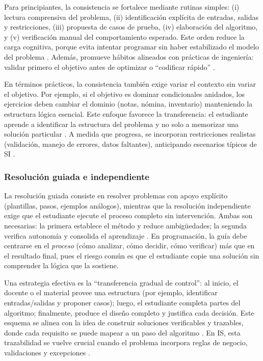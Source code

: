\documentclass[12pt,twoside]{book}
\begin{document}
						Para principiantes, la consistencia se fortalece mediante rutinas simples: (i) lectura comprensiva del problema, (ii) identificación explícita de entradas, salidas y restricciones, (iii) propuesta de casos de prueba, (iv) elaboración del algoritmo, y (v) verificación manual del comportamiento esperado. Este orden reduce la carga cognitiva, porque evita intentar programar sin haber estabilizado el modelo del problema \cite{Joyanes2007Fundamentos,Farrell2018Programming}. Además, promueve hábitos alineados con prácticas de ingeniería: validar primero el objetivo antes de optimizar o “codificar rápido” \cite{Pressman2019Software,ISOIECIEEE2018Requirements}.
						
						En términos prácticos, la consistencia también exige variar el contexto sin variar el objetivo. Por ejemplo, si el objetivo es dominar condicionales anidados, los ejercicios deben cambiar el dominio (notas, nómina, inventario) manteniendo la estructura lógica esencial. Este enfoque favorece la transferencia: el estudiante aprende a identificar la estructura del problema y no solo a memorizar una solución particular \cite{Gaddis2022Starting,Joyanes2007Fundamentos}. A medida que progresa, se incorporan restricciones realistas (validación, manejo de errores, datos faltantes), anticipando escenarios típicos de SI \cite{Laudon2020Management,Kendall2014Systems}.
						
					\subsubsection{Resolución guiada e independiente}
						\noindent
						La resolución guiada consiste en resolver problemas con apoyo explícito (plantillas, pasos, ejemplos análogos), mientras que la resolución independiente exige que el estudiante ejecute el proceso completo sin intervención. Ambas son necesarias: la primera establece el método y reduce ambigüedades; la segunda verifica autonomía y consolida el aprendizaje \cite{Farrell2018Programming,Gaddis2022Starting}. En programación, la guía debe centrarse en el \emph{proceso} (cómo analizar, cómo decidir, cómo verificar) más que en el resultado final, pues el riesgo común es que el estudiante copie una solución sin comprender la lógica que la sostiene.
						
						Una estrategia efectiva es la “transferencia gradual de control”: al inicio, el docente o el material provee una estructura (por ejemplo, identificar entradas/salidas y proponer casos); luego, el estudiante completa partes del algoritmo; finalmente, produce el diseño completo y justifica cada decisión. Este esquema se alinea con la idea de construir soluciones verificables y trazables, donde cada requisito se puede mapear a un paso del algoritmo \cite{ISOIECIEEE2018Requirements,Pressman2019Software}. En IS, esta trazabilidad se vuelve crucial cuando el problema incorpora reglas de negocio, validaciones y excepciones \cite{Laudon2020Management,Kendall2014Systems}.
						
\end{document}
